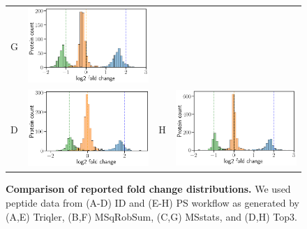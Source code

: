\documentclass[11pt]{article}
\begin{document}
\begin{figure}[hbt]
\begin{tabular}{lclc}
        G & \includegraphics[width=0.4\linewidth]{../../result/report_plots_filtered/diann_msstats_intensity.png} \\ 
        D & \includegraphics[width=0.4\linewidth]{../../result/report_plots_filtered/osw_top3_intensity.png} &
        H & \includegraphics[width=0.4\linewidth]{../../result/report_plots_filtered/diann_top3_intensity.png} 
    \end{tabular}
    \caption{{\bf Comparison of reported fold change distributions.} We used peptide data from (A-D) ID and (E-H) PS workflow as generated by 
    (A,E) Triqler, (B,F) MSqRobSum, (C,G) MSstats, and (D,H) Top3. \label{fig:fc_histogram_supplement}}
\end{figure}
\end{document}
